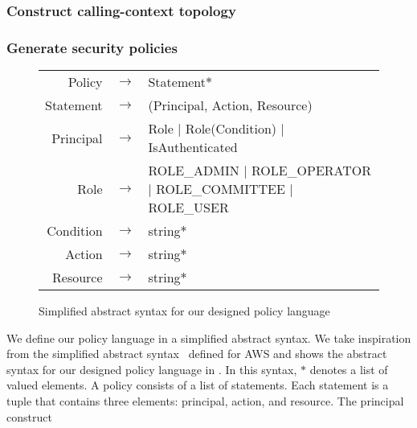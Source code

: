 \subsubsection{Construct calling-context topology}

\subsubsection{Generate security policies}

\begin{figure} [btp]
  \small
  \begin{tabular}{rcp{5cm}}
    Policy \hspace*{-3ex}    & $\rightarrow$ & \hspace*{-3ex} Statement$*$                                                      \\
    Statement \hspace*{-3ex} & $\rightarrow$ & \hspace*{-3ex} (Principal, Action, Resource)                                     \\
    Principal \hspace*{-3ex} & $\rightarrow$ & \hspace*{-3ex} Role $|$ Role(Condition) $|$ IsAuthenticated                      \\
    Role \hspace*{-3ex}      & $\rightarrow$ & \hspace*{-3ex} ROLE\_ADMIN $|$ ROLE\_OPERATOR $|$ ROLE\_COMMITTEE $|$ ROLE\_USER \\
    Condition \hspace*{-3ex} & $\rightarrow$ & \hspace*{-3ex} string$*$                                                         \\
    Action \hspace*{-3ex}    & $\rightarrow$ & \hspace*{-3ex} string$*$                                                         \\
    Resource \hspace*{-3ex}  & $\rightarrow$ & \hspace*{-3ex} string$*$                                                         \\
  \end{tabular}
  \caption{Simplified abstract syntax for our designed policy language}
  \label{fig:dsl}
\end{figure}

We define our policy language in a simplified abstract syntax.
%
We take inspiration from the simplified abstract
syntax~\cite{Backes+etal:2018:policy} defined for AWS and shows the abstract
syntax for our designed policy language in .
%
In this syntax, $*$ denotes a list of valued elements.
%
A policy consists of a list of statements.
%
Each statement is a tuple that contains three elements: principal, action, and
resource.
%
The principal construct


